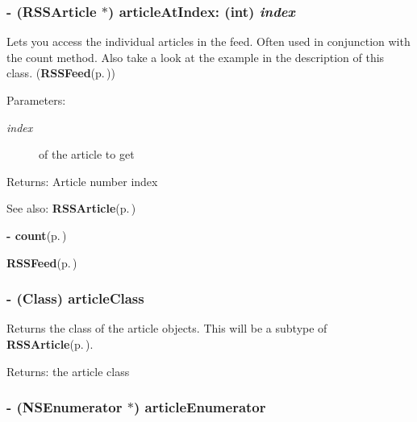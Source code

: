 \subsubsection{\setlength{\rightskip}{0pt plus 5cm}- ({\bf RSSArticle} $\ast$) article\-At\-Index: (int) {\em index}}\label{classRSSFeed_67504aa7863d4037014082024212dcce}


Lets you access the individual articles in the feed. Often used in conjunction with the count method. Also take a look at the example in the description of this class. ({\bf RSSFeed}{\rm (p.\,\pageref{classRSSFeed})})

\begin{Desc}
\item[Parameters:]
\begin{description}
\item[{\em index}]of the article to get \end{description}
\end{Desc}
\begin{Desc}
\item[Returns:]Article number index \end{Desc}
\begin{Desc}
\item[See also:]{\bf RSSArticle}{\rm (p.\,\pageref{interfaceRSSArticle})} 

{\bf - count}{\rm (p.\,\pageref{classRSSFeed_fe1812219c87bda10c4ae3b2833732eb})} 

{\bf RSSFeed}{\rm (p.\,\pageref{classRSSFeed})} \end{Desc}
\subsubsection{\setlength{\rightskip}{0pt plus 5cm}- (Class) {\bf article\-Class} }\label{classRSSFeed_2dae4f34cd0cf9880881daa45cec641b}


Returns the class of the article objects. This will be a subtype of {\bf RSSArticle}{\rm (p.\,\pageref{interfaceRSSArticle})}.

\begin{Desc}
\item[Returns:]the article class \end{Desc}
\subsubsection{\setlength{\rightskip}{0pt plus 5cm}- (NSEnumerator $\ast$) article\-Enumerator }\label{classRSSFeed_aa2900034a378b5380664cec2c09cddf}


